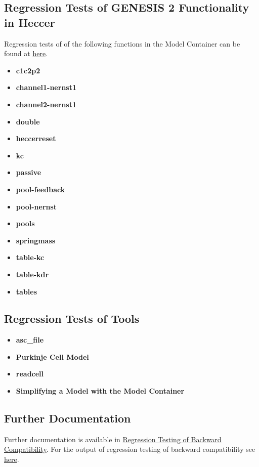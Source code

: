 \documentclass[12pt]{article}
\begin{document}
\subsection*{Regression Tests of GENESIS 2 Functionality in Heccer}

Regression tests of of the following functions in the Model Container can be found at \href{http://www.neurospaces.org/neurospaces_project/ns-sli/tests/html/specifications/heccer/main.html}{here}.

   \begin{itemize}
     \item[]{\bf c1c2p2}
     \item[]{\bf channel1-nernst1}
     \item[]{\bf channel2-nernst1	}
     \item[]{\bf double}
     \item[]{\bf heccerreset}
     \item[]{\bf kc}
     \item[]{\bf passive}
     \item[]{\bf pool-feedback}
     \item[]{\bf pool-nernst}
     \item[]{\bf pools}
     \item[]{\bf springmass}
     \item[]{\bf table-kc}
     \item[]{\bf table-kdr}
     \item[]{\bf tables}
   \end{itemize}
   
\subsection*{Regression Tests of Tools}
   \begin{itemize}
     \item[]{\bf asc\_file}
     \item[]{\bf Purkinje Cell Model}
     \item[]{\bf readcell}
     \item[]{\bf Simplifying a Model with the Model Container}
   \end{itemize}
   
\subsection*{Further Documentation}

Further documentation is available in \href{../tests-g2-backward-compatibility/tests-g2-backward-compatibility.tex}{Regression Testing of Backward Compatibility}. For the output of regression testing of backward compatibility see \href{http://www.neurospaces.org/neurospaces_project/ns-sli/tests/html/index.html}{here}.
\end{document}

